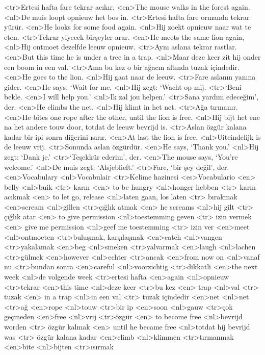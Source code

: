 <tr>Ertesi hafta fare tekrar acıkır.
<en>The mouse walks in the forest again.
<nl>De muis loopt opnieuw het bos in.
<tr>Ertesi hafta fare ormanda tekrar yürür.
<en>He looks for some food again.
<nl>Hij zoekt opnieuw naar wat te eten. 
<tr>Tekrar yiyecek birşeyler arar.
<en>He meets the same lion again,
<nl>Hij ontmoet dezelfde leeuw opnieuw.
<tr>Aynı aslana tekrar rastlar.
<en>But this time he is under a tree in a trap.
<nl>Maar deze keer zit hij onder een boom in een val.
<tr>Ama bu kez o bir ağacın altında tuzak içindedir. 
<en>He goes to the lion.
<nl>Hij gaat naar de leeuw.
<tr>Fare aslanın yanına gider.
<en>He says, `Wait for me.
<nl>Hij zegt: `Wacht op mij.
<tr>`Beni bekle.
<en>I will help you.’
<nl>Ik zal jou helpen.' 
<tr>Sana yardım edeceğim', der.
<en>He climbs the net.
<nl>Hij klimt in het net.
<tr>Ağa tırmanır.
<en>He bites one rope after the other,  until the lion is free.
<nl>Hij bijt het ene  na het andere touw door, totdat de leeuw bevrijd is.
<tr>Aslan özgür kalana kadar bir ipi sonra diğerini ısırır. 
<en>At last the lion is free.
<nl>Uiteindelijk is de leeuw vrij.
<tr>Sonunda aslan özgürdür.
<en>He says, `Thank you.'
<nl>Hij zegt: `Dank je.'
<tr>`Teşekkür ederim',  der.
<en>The mouse says, `You’re welcome.'
<nl>De muis zegt: `Alsjeblieft.'
<tr>Fare, `bir şey değil', der.
<en>Vocabulary
<nl>Vocabulair
<tr>Kelime hazinesi
<es>Vocabulario
<en> belly 
<nl>buik 
<tr> karın 
<en> to be hungry 
<nl>honger hebben 
<tr> karnı acıkmak 
<en> to let go, release 
<nl>laten gaan, los laten 
<tr> bırakmak
<en>scream
<nl>gillen
<tr>çığlık atmak
<en> he screams 
<nl>hij gilt 
<tr> çığlık atar
<en> to give permission 
<nl>toestemming geven 
<tr> izin vermek 
<en> give me permission 
<nl>geef me toestemming 
<tr> izin ver 
<en>meet
<nl>ontmoeten
<tr>buluşmak, karşılaşmak
<en>catch
<nl>vangen
<tr>yakalamak
<en>beg
<nl>smeken
<tr>yalvarmak
<en>laugh
<nl>lachen
<tr>gülmek
<en>however 
<nl>echter 
<tr>ancak
<en>from now on
<nl>vanaf nu
<tr>bundan sonra
<en>careful
<nl>voorzichtig
<tr>dikkatli
<en>the next week
<nl>de volgende week
<tr>ertesi hafta
<en>again
<nl>opnieuw
<tr>tekrar
<en>this time
<nl>deze keer
<tr>bu kez
<en> trap 
<nl>val 
<tr> tuzak 
<en> in a trap 
<nl>in een val 
<tr> tuzak içindedir
<en>net
<nl>net
<tr>ağ
<en>rope
<nl>touw
<tr>bir ip
<en>soon 
<nl>gauw
<tr>çok geçmeden
<en>free
<nl>vrij
<tr>özgür
<en> to become free 
<nl>bevrijd worden 
<tr> özgür kalmak  
<en> until he became free 
<nl>totdat hij bevrijd was 
<tr> özgür kalana kadar 
<en>climb
<nl>klimmen
<tr>tırmanmak
<en>bite
<nl>bijten
<tr>ısırmak
